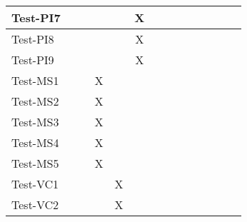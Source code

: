 \documentclass[12pt, titlepage]{article}
\begin{document}
\begin{table}[H]
\begin{adjustwidth}{-0.3in}{-0.5in}
{\begin{tabular}{c|c|c|c|c|c|c|c|c|c|c|c|c|c|}
\multicolumn{1}{|l|}{{Test-PI7}}   &             &             &             &             &     X        &             &             &             &              &              &              &             &                      \\ \hline
\multicolumn{1}{|l|}{{Test-PI8}}   &             &             &             &             &     X        &             &             &             &              &                            &             &  &                    \\ \hline
\multicolumn{1}{|l|}{{Test-PI9}}   &             &             &             &             &     X        &             &                          &              &              &              &             &  &                    \\ \hline
\multicolumn{1}{|l|}{{Test-MS1}}   &             &             &   X          &             &             &             &                          &              &              &              &             &  &                    \\ \hline
\multicolumn{1}{|l|}{{Test-MS2}}   &             &             &         X    &             &             &             &                          &              &              &              &             &  &                    \\ \hline
\multicolumn{1}{|l|}{{Test-MS3}}   &             &             &      X       &             &             &             &                          &              &              &              &             &  &                    \\ \hline
\multicolumn{1}{|l|}{{Test-MS4}}   &             &             &      X       &             &             &             &                          &              &              &              &             &  &                    \\ \hline
\multicolumn{1}{|l|}{{Test-MS5}}   &             &             &    X         &             &             &             &                          &              &              &              &             &  &                    \\ \hline
\multicolumn{1}{|l|}{{Test-VC1}}   &             &             &            &   X          &             &             &                          &              &              &              &             &  &                    \\ \hline
\multicolumn{1}{|l|}{{Test-VC2}}   &             &             &             &        X     &             &             &                          &              &              &              &             &  &                    \\ \hline

\end{tabular}}
\end{adjustwidth}
\end{table}
\end{document}

